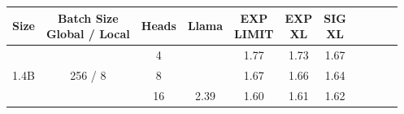 \begin{tabular}{ccc|cccccccc}
    \toprule
    Size                  & \thead{Batch Size \\ Global / Local}               & Heads & Llama & \thead{EXP                 \\ LIMIT} & \thead{EXP \\ XL} & \thead{SIG \\ XL} \\
    \midrule
    \multirow{3}{*}{1.4B} & \multirow{3}{*}{256 / 8} & 4     &         & 1.77      & 1.73    & 1.67 \\
                          &                          & 8     &         & 1.67      & 1.66    & 1.64 \\
                          &                          & 16    & 2.39    & 1.60      & 1.61    & 1.62 \\
    \bottomrule
\end{tabular}
